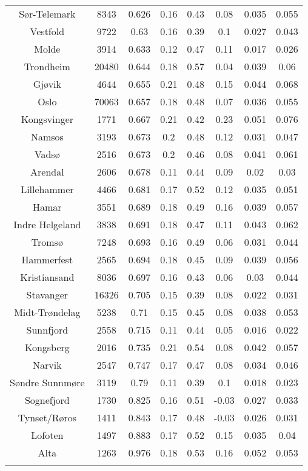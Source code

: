\begin{tabular}{@{\extracolsep{2pt}} cccccccc}
Sør-Telemark & 8343 & 0.626 & 0.16 & 0.43 & 0.08 & 0.035 & 0.055 \\ 
Vestfold & 9722 & 0.63 & 0.16 & 0.39 & 0.1 & 0.027 & 0.043 \\ 
Molde & 3914 & 0.633 & 0.12 & 0.47 & 0.11 & 0.017 & 0.026 \\ 
Trondheim & 20480 & 0.644 & 0.18 & 0.57 & 0.04 & 0.039 & 0.06 \\ 
Gjøvik & 4644 & 0.655 & 0.21 & 0.48 & 0.15 & 0.044 & 0.068 \\ 
Oslo & 70063 & 0.657 & 0.18 & 0.48 & 0.07 & 0.036 & 0.055 \\ 
Kongsvinger & 1771 & 0.667 & 0.21 & 0.42 & 0.23 & 0.051 & 0.076 \\ 
Namsos & 3193 & 0.673 & 0.2 & 0.48 & 0.12 & 0.031 & 0.047 \\ 
Vadsø & 2516 & 0.673 & 0.2 & 0.46 & 0.08 & 0.041 & 0.061 \\ 
Arendal & 2606 & 0.678 & 0.11 & 0.44 & 0.09 & 0.02 & 0.03 \\ 
Lillehammer & 4466 & 0.681 & 0.17 & 0.52 & 0.12 & 0.035 & 0.051 \\ 
Hamar & 3551 & 0.689 & 0.18 & 0.49 & 0.16 & 0.039 & 0.057 \\ 
Indre Helgeland & 3838 & 0.691 & 0.18 & 0.47 & 0.11 & 0.043 & 0.062 \\ 
Tromsø & 7248 & 0.693 & 0.16 & 0.49 & 0.06 & 0.031 & 0.044 \\ 
Hammerfest & 2565 & 0.694 & 0.18 & 0.45 & 0.09 & 0.039 & 0.056 \\ 
Kristiansand & 8036 & 0.697 & 0.16 & 0.43 & 0.06 & 0.03 & 0.044 \\ 
Stavanger & 16326 & 0.705 & 0.15 & 0.39 & 0.08 & 0.022 & 0.031 \\ 
Midt-Trøndelag & 5238 & 0.71 & 0.15 & 0.45 & 0.08 & 0.038 & 0.053 \\ 
Sunnfjord & 2558 & 0.715 & 0.11 & 0.44 & 0.05 & 0.016 & 0.022 \\ 
Kongsberg & 2016 & 0.735 & 0.21 & 0.54 & 0.08 & 0.042 & 0.057 \\ 
Narvik & 2547 & 0.747 & 0.17 & 0.47 & 0.08 & 0.034 & 0.046 \\ 
Søndre Sunnmøre & 3119 & 0.79 & 0.11 & 0.39 & 0.1 & 0.018 & 0.023 \\ 
Sognefjord & 1730 & 0.825 & 0.16 & 0.51 & -0.03 & 0.027 & 0.033 \\ 
Tynset/Røros & 1411 & 0.843 & 0.17 & 0.48 & -0.03 & 0.026 & 0.031 \\ 
Lofoten & 1497 & 0.883 & 0.17 & 0.52 & 0.15 & 0.035 & 0.04 \\ 
Alta & 1263 & 0.976 & 0.18 & 0.53 & 0.16 & 0.052 & 0.053 \\ 
\hline \\[-1.8ex] 
\end{tabular} 
